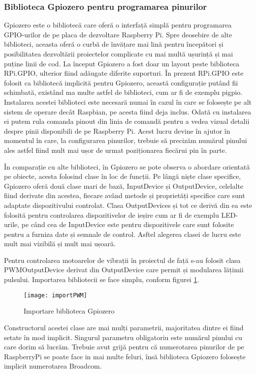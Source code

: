 \documentclass[../IoMusT.tex]{subfiles}
\begin{document}
\subsubsection{Biblioteca Gpiozero pentru programarea pinurilor}
Gpiozero este o bibliotecă care oferă o interfață simplă pentru programarea GPIO-urilor de pe placa de dezvoltare Raspberry Pi. Spre deosebire de alte biblioteci, aceasta oferă o curbă de învățare mai lină pentru începători și posibilitatea dezvoltării proiectelor complicate cu mai multă ușurință și mai puține linii de cod. La început Gpiozero a fost doar un layout peste biblioteca RPi.GPIO, ulterior fiind adăugate diferite suporturi. În prezent RPi.GPIO este folosit ca bibliotecă implicită pentru Gpiozero, această configurație putând fii schimbată, existând ma multe astfel de biblioteci, cum ar fi de exemplu pigpio. Instalarea acestei biblioteci este necesară numai în cazul în care se folosește pe alt sistem de operare decât Raspbian, pe acesta fiind deja inclus. Odată cu instalarea ei putem rula comanda pinout din linia de comandă pentru a vedea vizual detalii despre pinii disponibili de pe Raspberry Pi. Acest lucru devine în ajutor în momentul în care, la configurarea pinurilor, trebuie să precizăm numărul pinului ales astfel fiind mult mai ușor de urmat poziționarea fiecărui pin în parte.
\\
\par În comparație cu alte biblioteci, în Gpiozero se pote observa o abordare orientată pe obiecte, acesta folosind clase în loc de funcții. Pe lângă niște clase specifice, Gpiozero oferă două clase mari de bază, InputDevice și OutputDevice, celelalte fiind derivate din acestea, fiecare având metode și proprietăți specifice care sunt adaptate dispozitivului controlat. Clasa OutputDevices și tot ce derivă din ea este folosită pentru controlarea dispozitivelor de ieșire cum ar fi de exemplu LED-urile, pe când cea de InputDevice este pentru dispozitivele care sunt folosite pentru a furniza date și semnale de control. Asftel alegerea clasei de lucru este mult mai vizibilă și mult mai ușoară.
\\
\par Pentru controlarea motoarelor de vibrații în proiectul de față s-au folosit clasa PWMOutputDevice derivat din OutputDevice care permit și modularea lățimii pulsului. Importarea bibliotecii se face simplu, conform figurei \ref{fig:import}.
\begin{figure}[h]
\centering
\texttt{[image: importPWM]}
\caption{Importare biblioteca Gpiozero}
\label{fig:import}
\end{figure}
Constructorul acestei clase are mai mulți parametrii, majoritatea dintre ei fiind setate în mod implicit. Singurul parametru obligatoriu este numărul pinului cu care dorim să lucrăm. Trebuie avut grijă pentru că numerotarea pinurilor de pe RaspberryPi se poate face in mai multe feluri, însă biblioteca Gpiozero folosește implicit numerotarea Broadcom.
\end{document}
